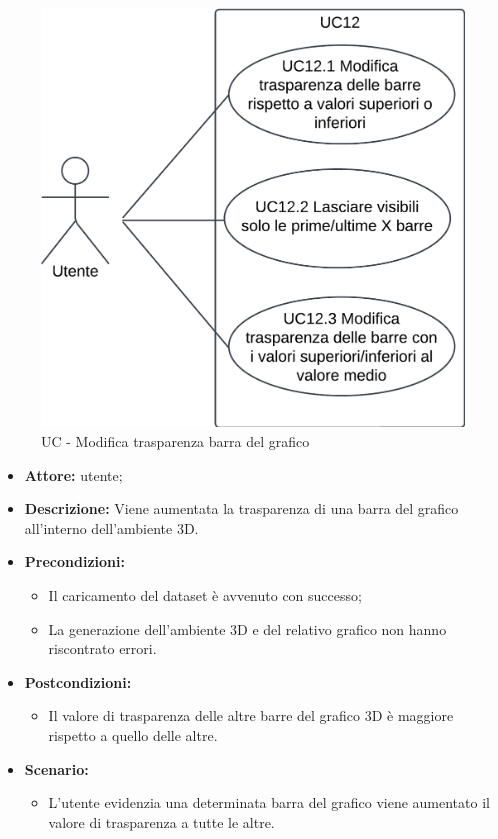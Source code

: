\begin{figure}[h!]\centering
    \includegraphics[scale=0.7]{template/images/UC12.png}
    \caption{UC - Modifica trasparenza barra del grafico}
\end{figure}
\begin{itemize}    
    \item \textbf{Attore:} utente;
    \item \textbf{Descrizione:} Viene aumentata la trasparenza di una barra del grafico all'interno dell'ambiente 3D.
    \item \textbf{Precondizioni:}    
        \begin{itemize}
            \item Il caricamento del dataset è avvenuto con successo;
            \item La generazione dell'ambiente 3D e del relativo grafico non hanno riscontrato errori.
        \end{itemize}    
    \item \textbf{Postcondizioni:}
        \begin{itemize}
            \item Il valore di trasparenza delle altre barre del grafico 3D è maggiore rispetto a quello delle altre.
        \end{itemize}    
    \item \textbf{Scenario:} 
        \begin{itemize}
            \item L'utente evidenzia una determinata barra del grafico viene aumentato il valore di trasparenza a tutte le altre.
        \end{itemize}
\end{itemize}
